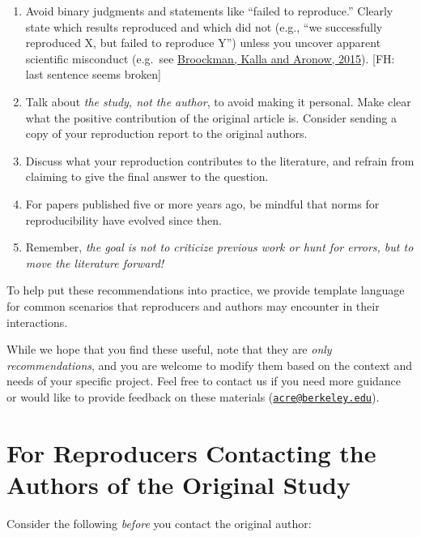 \documentclass[]{book}
\providecommand{\tightlist}{%
  \setlength{\itemsep}{0pt}\setlength{\parskip}{0pt}}
\begin{document}
\begin{enumerate}
\def\labelenumi{\alph{enumi}.}
\tightlist
\item
  Avoid binary judgments and statements like ``failed to reproduce.'' Clearly state which results reproduced and which did not (e.g., ``we successfully reproduced X, but failed to reproduce Y'') unless you uncover apparent scientific misconduct (e.g.~see \href{https://osf.io/qy2se/}{Broockman, Kalla and Aronow, 2015}). {[}FH: last sentence seems broken{]}
\item
  Talk about \emph{the study, not the author}, to avoid making it personal. Make clear what the positive contribution of the original article is. Consider sending a copy of your reproduction report to the original authors.\\
\item
  Discuss what your reproduction contributes to the literature, and refrain from claiming to give the final answer to the question.\\
\item
  For papers published five or more years ago, be mindful that norms for reproducibility have evolved since then.\\
\item
  Remember, \emph{the goal is not to criticize previous work or hunt for errors, but to move the literature forward!}
\end{enumerate}

To help put these recommendations into practice, we provide template language for common scenarios that reproducers and authors may encounter in their interactions.

While we hope that you find these useful, note that they are \emph{only recommendations}, and you are welcome to modify them based on the context and needs of your specific project. Feel free to contact us if you need more guidance or would like to provide feedback on these materials (\href{mailto:acre@berkeley.edu}{\nolinkurl{acre@berkeley.edu}}).

\hypertarget{for-reproducers-contacting-the-authors-of-the-original-study}{%
\section{For Reproducers Contacting the Authors of the Original Study}\label{for-reproducers-contacting-the-authors-of-the-original-study}}

Consider the following \emph{before} you contact the original author:
\end{document}
